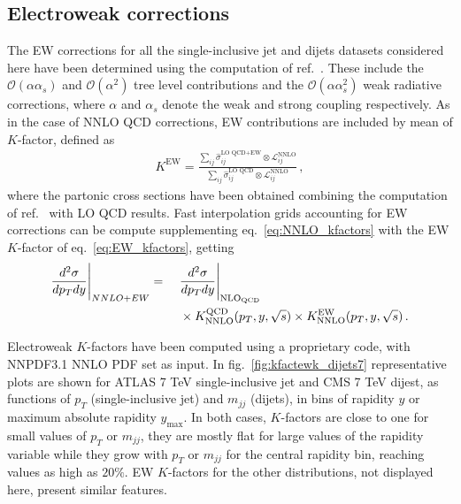 \subsection{Electroweak corrections}
The EW corrections for all the single-inclusive jet and dijets datasets considered here have been determined 
using the computation of ref.~\cite{Dittmaier:2012kx}.
These include the $\mathcal{O}\left(\alpha\alpha_s\right)$ and $\mathcal{O}\left(\alpha^2\right)$ tree level contributions 
and the $\mathcal{O}\left(\alpha\alpha_s^2\right)$ weak radiative corrections, where $\alpha$ and $\alpha_s$
denote the weak and strong coupling respectively.
As in the case of NNLO QCD corrections, EW contributions are included by mean of $K$-factor, defined as
\begin{align}
    \label{eq:EW_kfactors}
    K^{\text{EW}} = \frac{\sum_{ij}\hat{\sigma}_{ij}^{\text{LO QCD}+\text{EW}}\otimes \mathcal{L}_{ij}^{\text{NNLO}}}
    {\sum_{ij}\hat{\sigma}_{ij}^{\text{LO QCD}}\otimes \mathcal{L}_{ij}^{\text{NNLO}}}\,,
\end{align}
where the partonic cross sections have been obtained combining the computation of ref.~\cite{Dittmaier:2012kx} 
with LO QCD results.
Fast interpolation grids accounting for EW corrections can be compute
supplementing eq.~\eqref{eq:NNLO_kfactors} with the EW $K$-factor of eq.~\eqref{eq:EW_kfactors}, getting
\begin{align}
    \label{eq:NNLO_EW_kfactors}
    \frac{d^2\sigma}{dp_T dy}\Bigg|_{NNLO+EW} =\,\,\,\,\,\,\,\, &\frac{d^2\sigma}{dp_T dy} 
    \Bigg|_{\rm NLO_{QCD}} \nonumber\\ &\times K_{\rm NNLO}^{\rm QCD}(p_T,y,\sqrt{s})
    \times K_{\rm NNLO}^{\rm EW}(p_T,y,\sqrt{s})\,.
\end{align}

Electroweak $K$-factors have been computed using a proprietary code, with NNPDF3.1 NNLO PDF set as input.
In fig.~\ref{fig:kfactewk_dijets7} representative plots are shown for ATLAS 7 TeV single-inclusive jet and CMS 7 TeV dijest,
as functions of $p_T$ (single-inclusive jet) and $m_{jj}$ (dijets), in bins of rapidity $y$
or maximum absolute rapidity $y_{\text{max}}$. In both cases, $K$-factors are close to one for small
values of $p_T$ or $m_{jj}$, they are mostly flat for large values of the rapidity variable while 
they grow with $p_T$ or $m_{jj}$  for the central rapidity bin, reaching values as high as $20\%$.
EW $K$-factors for the other distributions, not displayed here, present similar features.

